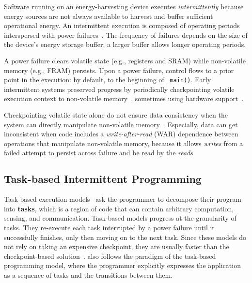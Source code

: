Software running on an energy-harvesting device executes {\em intermittently}
because energy sources are not always available to harvest and buffer
sufficient operational energy. An intermittent execution is composed of
operating periods interspersed with power
failures~\cite{dino,chain,alpaca,ratchet}. The frequency of failures depends on
the size of the device's energy storage buffer: a larger buffer allows longer
operating periods. 

A power failure clears volatile state (e.g., registers and SRAM) while
non-volatile memory (e.g., FRAM) persists. Upon a power failure, control flows
to a prior point in the execution: by default, to the beginning of {\tt
main()}. Early intermittent systems preserved progress by periodically
checkpointing volatile execution context to non-volatile
memory~\cite{mementos}, sometimes using hardware
support~\cite{mottola2017harvos,hibernusplusplus,hibernus,idetic,quickrecall}. 

Checkpointing volatile state alone do not ensure data consistency when the
system can directly manipulate non-volatile memory~\cite{mspcdino}.
Especially, data can get inconsistent when code includes a
\emph{write-after-read} (WAR) dependence between operations that manipulate
non-volatile memory, because it allows {\em writes} from a failed attempt to
persist across failure and be read by the {\em
reads}~\cite{ratchet,dino,alpaca}


\subsection{Task-based Intermittent Programming}
\label{section:background_task_computing}

Task-based execution models~\cite{dino,chain,alpaca} ask the programmer to
decompose their program into \textbf{tasks}, which is a region of code that can contain
arbitrary computation, sensing, and communication.  Task-based models progress at the granularity of tasks. They re-execute each task interrupted by a power failure until it successfully finishes, only then moving on to
the next task. Since these models do not rely on taking an expensive
checkpoint, they are usually faster than the checkpoint-based
solution~\cite{chain, alpaca}.  \sys also follows the paradigm of the
task-based programming model, where the programmer explicitly expresses the
application as a sequence of tasks and the transitions between them.

